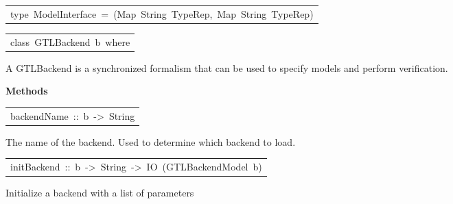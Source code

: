 \begin{haddockdesc}
\item[\begin{tabular}{@{}l}
type\ ModelInterface\ =\ (Map\ String\ TypeRep,\ Map\ String\ TypeRep)
\end{tabular}]
\end{haddockdesc}
\begin{haddockdesc}
\item[\begin{tabular}{@{}l}
class\ GTLBackend\ b\ where
\end{tabular}]\haddockbegindoc
A GTLBackend is a synchronized formalism that can be used to specify models and perform verification.
\par

\haddockpremethods{}\textbf{Methods}
\begin{haddockdesc}
\item[\begin{tabular}{@{}l}
backendName\ ::\ b\ ->\ String
\end{tabular}]\haddockbegindoc
The name of the backend. Used to determine which backend to load.
\par

\end{haddockdesc}
\begin{haddockdesc}
\item[\begin{tabular}{@{}l}
initBackend\ ::\ b\ ->\ {\char 91}String{\char 93}\ ->\ IO\ (GTLBackendModel\ b)
\end{tabular}]\haddockbegindoc
Initialize a backend with a list of parameters
\par

\end{haddockdesc}
\end{haddockdesc}
